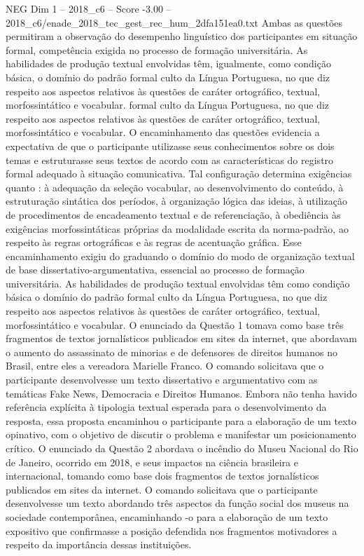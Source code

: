 \begin{textsample}{NEG Dim 1 – 2018\_c6 – Score -3.00 – 2018\_c6/enade\_2018\_tec\_gest\_rec\_hum\_2dfa151ea0.txt}
Ambas as questões permitiram a observação do desempenho linguístico dos participantes em situação formal, competência exigida no processo de formação universitária.
As habilidades de produção textual envolvidas têm, igualmente, como condição básica, o domínio do padrão formal culto da Língua Portuguesa, no que diz respeito aos aspectos relativos às questões de caráter ortográfico, textual, morfossintático e vocabular. formal culto da Língua Portuguesa, no que diz respeito aos aspectos relativos às questões de caráter ortográfico, textual, morfossintático e vocabular.
O encaminhamento das questões evidencia a expectativa de que o participante utilizasse seus conhecimentos sobre os dois temas e estruturasse seus textos de acordo com as características do registro formal adequado à situação comunicativa.
Tal configuração determina exigências quanto : à adequação da seleção vocabular, ao desenvolvimento do conteúdo, à estruturação sintática dos períodos, à organização lógica das ideias, à utilização de procedimentos de encadeamento textual e de referenciação, à obediência às exigências morfossintáticas próprias da modalidade escrita da norma-padrão, ao respeito às regras ortográficas e às regras de acentuação gráfica.
Esse encaminhamento exigiu do graduando o domínio do modo de organização textual de base dissertativo-argumentativa, essencial ao processo de formação universitária.
As habilidades de produção textual envolvidas têm como condição básica o domínio do padrão formal culto da Língua Portuguesa, no que diz respeito aos aspectos relativos às questões de caráter ortográfico, textual, morfossintático e vocabular.
O enunciado da Questão 1 tomava como base três fragmentos de textos jornalísticos publicados em sites da internet, que abordavam o aumento do assassinato de minorias e de defensores de direitos humanos no Brasil, entre eles a vereadora Marielle Franco.
O comando solicitava que o participante desenvolvesse um texto dissertativo e argumentativo com as temáticas Fake News, Democracia e Direitos Humanos.
Embora não tenha havido referência explícita à tipologia textual esperada para o desenvolvimento da resposta, essa proposta encaminhou o participante para a elaboração de um texto opinativo, com o objetivo de discutir o problema e manifestar um posicionamento crítico.
O enunciado da Questão 2 abordava o incêndio do Museu Nacional do Rio de Janeiro, ocorrido em 2018, e seus impactos na ciência brasileira e internacional, tomando como base dois fragmentos de textos jornalísticos publicados em sites da internet.
O comando solicitava que o participante desenvolvesse um texto abordando três aspectos da função social dos museus na sociedade contemporânea, encaminhando -o para a elaboração de um texto expositivo que confirmasse a posição defendida nos fragmentos motivadores a respeito da importância dessas instituições.

\end{textsample}
